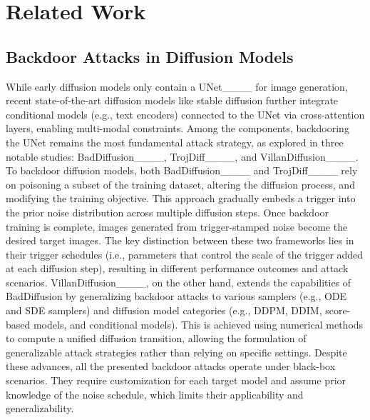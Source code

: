 \section{Related Work}
\label{section:related-work}

\subsection{Backdoor Attacks in Diffusion Models}
While early diffusion models only contain a UNet____ for image generation, recent state-of-the-art diffusion models like stable diffusion further integrate conditional models (e.g., text encoders) connected to the UNet via cross-attention layers, enabling multi-modal constraints. Among the components, backdooring the UNet remains the most fundamental attack strategy, as explored in three notable studies: BadDiffusion____, TrojDiff____, and VillanDiffusion____. 
To backdoor diffusion models, both BadDiffusion____ and TrojDiff____ rely on poisoning a subset of the training dataset, altering the diffusion process, and modifying the training objective. This approach gradually embeds a trigger into the prior noise distribution across multiple diffusion steps. Once backdoor training is complete, images generated from trigger-stamped noise become the desired target images. The key distinction between these two frameworks lies in their trigger schedules (i.e., parameters that control the scale of the trigger added at each diffusion step), resulting in different performance outcomes and attack scenarios. 
VillanDiffusion____, on the other hand, extends the capabilities of BadDiffusion by generalizing backdoor attacks to various samplers (e.g., ODE and SDE samplers) and diffusion model categories (e.g., DDPM, DDIM, score-based models, and conditional models). This is achieved using numerical methods to compute a unified diffusion transition, allowing the formulation of generalizable attack strategies rather than relying on specific settings.
Despite these advances, all the presented backdoor attacks operate under black-box scenarios. They require customization for each target model and assume prior knowledge of the noise schedule, which limits their applicability and generalizability.

